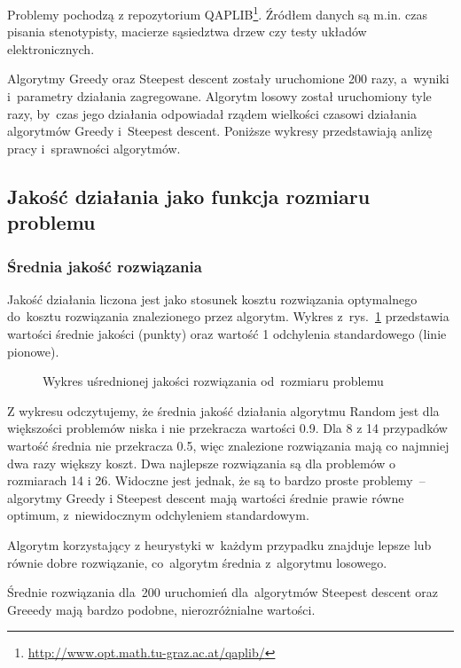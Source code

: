 \documentclass[a4paper,10pt]{article}
\begin{document}
Problemy pochodzą z repozytorium QAPLIB\footnote{\url{http://www.opt.math.tu-graz.ac.at/qaplib/}}.
Źródłem danych są m.in. czas pisania stenotypisty, macierze sąsiedztwa drzew czy testy układów elektronicznych.

Algorytmy Greedy oraz Steepest descent zostały uruchomione 200 razy, a~wyniki i~parametry działania zagregowane. 
Algorytm losowy został uruchomiony tyle razy, by~czas jego działania odpowiadał rządem wielkości czasowi działania algorytmów Greedy
i~Steepest descent.
Poniższe wykresy przedstawiają anlizę pracy i~sprawności algorytmów.
\subsection{Jakość działania jako funkcja rozmiaru problemu}
\subsubsection{Średnia jakość rozwiązania}
Jakość działania liczona jest jako stosunek kosztu rozwiązania optymalnego do~kosztu rozwiązania znalezionego przez
algorytm.
Wykres z~rys.~\ref{fig:qualityvssizemean} przedstawia wartości średnie jakości (punkty) oraz wartość 1 odchylenia standardowego (linie pionowe).

\begin{figure}[h!]
\begin{center}

\caption{Wykres uśrednionej jakości rozwiązania od~rozmiaru problemu}
\label{fig:qualityvssizemean}
\end{center}
\end{figure}

Z wykresu odczytujemy, że średnia jakość działania algorytmu Random jest dla większości problemów niska i nie przekracza wartości \num{0.9}.  
Dla 8 z 14 przypadków wartość średnia nie przekracza \num{0.5}, więc znalezione rozwiązania mają co najmniej dwa razy większy koszt.
Dwa najlepsze rozwiązania są dla problemów o rozmiarach 14 i 26.
Widoczne jest jednak, że są to bardzo proste problemy~-- algorytmy Greedy i Steepest descent mają wartości średnie prawie równe optimum,
z~niewidocznym odchyleniem standardowym.

Algorytm korzystający z heurystyki w~każdym przypadku znajduje lepsze lub równie dobre rozwiązanie, co~algorytm średnia z~algorytmu losowego.

Średnie rozwiązania dla~200 uruchomień dla~algorytmów Steepest descent oraz Greeedy mają bardzo podobne, nierozróżnialne wartości.
\end{document}
